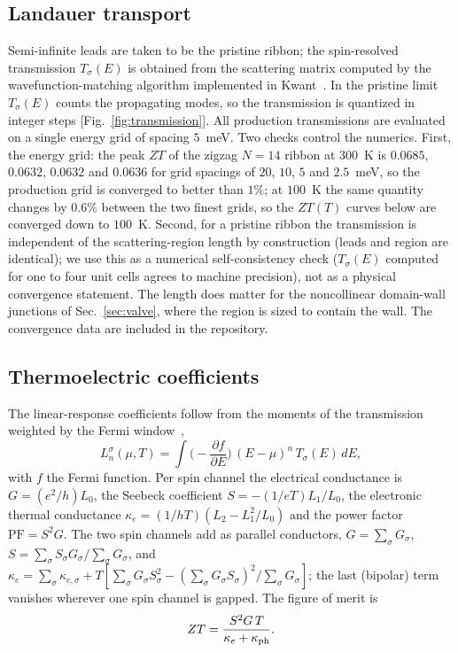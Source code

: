 \documentclass[preprint,12pt]{elsarticle}
\begin{document}
\subsection{Landauer transport}
Semi-infinite leads are taken to be the pristine ribbon; the spin-resolved transmission
$T_\sigma(E)$ is obtained from the scattering matrix computed by the wavefunction-matching
algorithm implemented in Kwant~\cite{Groth2014kwant}. In the pristine limit $T_\sigma(E)$ counts
the propagating modes, so the transmission is quantized in integer steps
[Fig.~\ref{fig:transmission}]. All production transmissions are evaluated on a single energy
grid of spacing $5$~meV. Two checks control the numerics. First, the energy grid: the peak
$ZT$ of the zigzag $N{=}14$ ribbon at $300$~K is $0.0685$, $0.0632$, $0.0632$ and $0.0636$ for
grid spacings of $20$, $10$, $5$ and $2.5$~meV, so the production grid is converged to better
than $1\%$; at $100$~K the same quantity changes by $0.6\%$ between the two finest grids, so
the $ZT(T)$ curves below are converged down to $100$~K. Second, for a pristine ribbon the transmission is independent of the
scattering-region length by construction (leads and region are identical); we use this as a
numerical self-consistency check ($T_\sigma(E)$ computed for one to four unit cells agrees to
machine precision), not as a physical convergence statement. The length does matter for the
noncollinear domain-wall junctions of Sec.~\ref{sec:valve}, where the region is sized to
contain the wall. The convergence data are included in the repository.

\subsection{Thermoelectric coefficients}
The linear-response coefficients follow from the moments of the transmission weighted by the
Fermi window~\cite{SivanImry1986,CutlerMott1969,Datta1995},
\begin{equation}
L_n^\sigma(\mu,T)=\int\!\Big(\!-\frac{\partial f}{\partial E}\Big)\,(E-\mu)^n\,T_\sigma(E)\,dE ,
\end{equation}
with $f$ the Fermi function. Per spin channel the electrical conductance is $G=(e^2/h)L_0$, the
Seebeck coefficient $S=-(1/eT)L_1/L_0$, the electronic thermal conductance
$\kappa_e=(1/hT)(L_2-L_1^2/L_0)$ and the power factor $\mathrm{PF}=S^2G$. The two spin channels
add as parallel conductors, $G=\sum_\sigma G_\sigma$,
$S=\sum_\sigma S_\sigma G_\sigma/\sum_\sigma G_\sigma$, and
$\kappa_e=\sum_\sigma\kappa_{e,\sigma}+T[\sum_\sigma G_\sigma S_\sigma^2-(\sum_\sigma G_\sigma
S_\sigma)^2/\sum_\sigma G_\sigma]$; the last (bipolar) term vanishes wherever one spin channel
is gapped. The figure of merit is
\begin{equation}
ZT=\frac{S^2 G\,T}{\kappa_e+\kappa_{\rm ph}} .
\end{equation}
\end{document}
